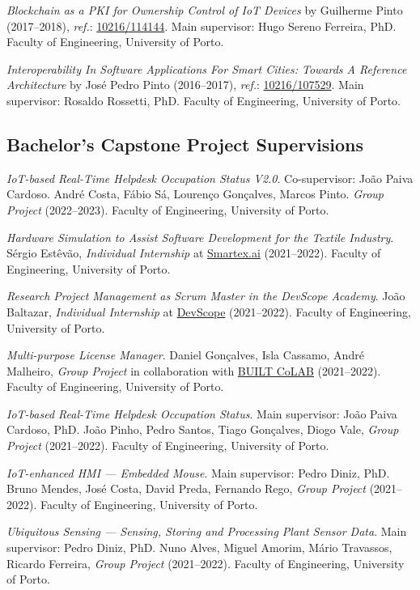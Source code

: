 \documentclass[10pt, a4paper]{article}
\newcommand{\FEUP}{Faculty of Engineering, University of Porto}
\begin{document}
\begin{etaremune}
	\item \textit{Blockchain as a PKI for Ownership Control of IoT Devices} by Guilherme Pinto (2017--2018), \textit{ref.}: \href{http://hdl.handle.net/10216/114144}{10216/114144}. Main supervisor: Hugo Sereno Ferreira, PhD. \FEUP.
	
	\item \textit{Interoperability In Software Applications For Smart Cities: Towards A Reference Architecture} by José Pedro Pinto (2016--2017), \textit{ref.}:  \href{http://hdl.handle.net/10216/107529}{10216/107529}. Main supervisor: Rosaldo Rossetti, PhD. \FEUP.
\end{etaremune}

\subsection*{Bachelor's Capstone Project Supervisions}

\begin{etaremune}
	\renewcommand\labelenumi{\footnotesize\theenumi .}
 \item \textit{IoT-based Real-Time Helpdesk Occupation Status V2.0}. Co-supervisor: João Paiva Cardoso. André Costa, Fábio Sá, Lourenço Gonçalves, Marcos Pinto. \textit{Group Project} (2022--2023). \FEUP.
	\item \textit{Hardware Simulation to Assist Software Development for the Textile Industry}. Sérgio Estêvão, \textit{Individual Internship} at \href{https://www.smartex.ai/}{Smartex.ai} (2021--2022). \FEUP. 
	\item \textit{Research Project Management as Scrum Master in the DevScope Academy}. João Baltazar, \textit{Individual Internship} at \href{https://www.devscope.net/}{DevScope} (2021--2022). \FEUP. 
	
	\item \textit{Multi-purpose License Manager}. Daniel Gonçalves, Isla Cassamo, André Malheiro, \textit{Group Project} in collaboration with \href{https://www.builtcolab.pt/}{BUILT CoLAB} (2021--2022). \FEUP.
	
	\item \textit{IoT-based Real-Time Helpdesk Occupation Status}. Main supervisor: João Paiva Cardoso, PhD. João Pinho, Pedro Santos, Tiago Gonçalves, Diogo Vale, \textit{Group Project} (2021--2022). \FEUP.
	
	\item \textit{IoT-enhanced HMI --- Embedded Mouse}. Main supervisor: Pedro Diniz, PhD. Bruno Mendes, José Costa, David Preda, Fernando Rego, \textit{Group Project} (2021--2022). \FEUP.
	
	\item \textit{Ubiquitous Sensing --- Sensing, Storing and Processing Plant Sensor Data}. Main supervisor: Pedro Diniz, PhD. Nuno Alves, Miguel Amorim, Mário Travassos, Ricardo Ferreira, \textit{Group Project} (2021--2022). \FEUP.
\end{etaremune}
\end{document}
